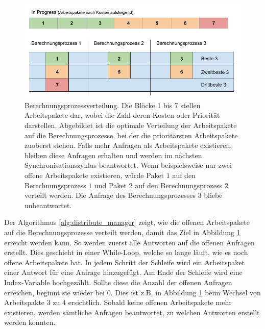 \begin{figure}[h!]
    \begin{center}
        \includegraphics[width=0.8\linewidth]{../common/03_billiard_ai/resources/20_berechnungsprozess_verteilung.png}
    \end{center}
    \caption{Berechnungsprozessverteilung. Die Blöcke 1 bis 7 stellen Arbeitspakete dar, wobei die Zahl deren Kosten oder Priorität darstellen.
    Abgebildet ist die optimale Verteilung der Arbeitspakete auf die Berechnungsprozesse, bei der die prioritärsten Arbeitspakete zuoberst stehen.
    Falls mehr Anfragen als Arbeitspakete existieren, bleiben diese Anfragen erhalten und werden im nächsten Synchronisationszyklus beantwortet.
    Wenn beispielsweise nur zwei offene Arbeitspakete existieren, würde Paket $1$ auf den Berechnungsprozess $1$
    und Paket $2$ auf den Berechnungsprozess $2$ verteilt werden.
    Die Anfrage des Berechnungsprozesses $3$ bliebe unbeantwortet.
    }
    \label{fig:berechnungsprozess_verteilung}
\end{figure}

Der Algorithmus \ref{alg:distribute_manager} zeigt, wie die offenen Arbeitspakete auf die Berechnungsprozesse verteilt
werden, damit das Ziel in Abbildung \ref{fig:berechnungsprozess_verteilung} erreicht werden kann. So werden
zuerst alle Antworten auf die offenen Anfragen erstellt. Dies geschieht in einer \glqq While-Loop\grqq, welche so lange
läuft, wie es noch offene Arbeitspakete hat. In jedem Schritt der Schleife wird ein Arbeitspaket einer Antwort für eine
Anfrage hinzugefügt. Am Ende der Schleife wird eine Index-Variable hochgezählt. Sollte diese die Anzahl der offenen Anfragen
erreichen, beginnt sie wieder bei 0. Dies ist z.B. in Abbildung \ref{fig:berechnungsprozess_verteilung} beim Wechsel von
Arbeitspakte $3$ zu $4$ ersichtlich. Sobald keine offenen Arbeitspakete mehr existieren, werden sämtliche Anfragen
beantwortet, zu welchen Antworten erstellt werden konnten.

